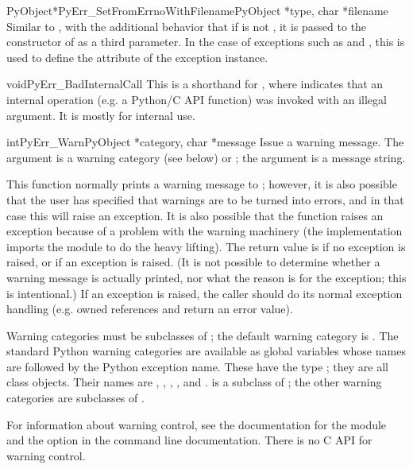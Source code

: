 \documentclass{manual}
\begin{document}
\begin{cfuncdesc}{PyObject*}{PyErr_SetFromErrnoWithFilename}{PyObject *type,
                                                             char *filename}
Similar to , with the additional
behavior that if  is not \NULL, it is passed to the
constructor of  as a third parameter.  In the case of
exceptions such as  and , this
is used to define the  attribute of the exception
instance.
\end{cfuncdesc}

\begin{cfuncdesc}{void}{PyErr_BadInternalCall}{}
This is a shorthand for , where  indicates that an internal
operation (e.g. a Python/C API function) was invoked with an illegal
argument.  It is mostly for internal use.
\end{cfuncdesc}

\begin{cfuncdesc}{int}{PyErr_Warn}{PyObject *category, char *message}
Issue a warning message.  The  argument is a warning
category (see below) or \NULL; the  argument is a message
string.

This function normally prints a warning message to ;
however, it is also possible that the user has specified that warnings
are to be turned into errors, and in that case this will raise an
exception.  It is also possible that the function raises an exception
because of a problem with the warning machinery (the implementation
imports the  module to do the heavy lifting).  The
return value is  if no exception is raised, or  if
an exception is raised.  (It is not possible to determine whether a
warning message is actually printed, nor what the reason is for the
exception; this is intentional.)  If an exception is raised, the
caller should do its normal exception handling
(e.g.  owned references and return an error
value).

Warning categories must be subclasses of ; the default
warning category is .  The standard Python
warning categories are available as global variables whose names are
 followed by the Python exception name.  These have the
type ; they are all class objects.  Their names are
, ,
, , and
.   is a subclass of
; the other warning categories are subclasses
of .

For information about warning control, see the documentation for the
 module and the  option in the command
line documentation.  There is no C API for warning control.
\end{cfuncdesc}
\end{document}
